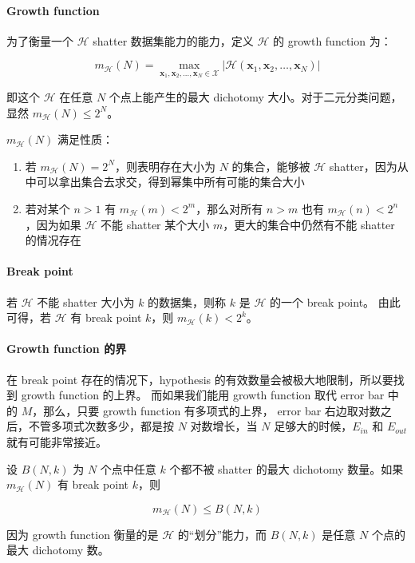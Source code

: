 \documentclass[a4paper]{article}
\begin{document}
\paragraph{Growth function}
为了衡量一个 $\mathcal{H}$ shatter 数据集能力的能力，定义 $\mathcal{H}$ 的 growth function 为：

$$m_{\mathcal{H}}(N) = \max_{\mathbf{x}_1, \mathbf{x}_2, \dots, \mathbf{x}_N \in \mathcal{X}}|\mathcal{H}(\mathbf{x}_1, \mathbf{x}_2, \dots, \mathbf{x}_N)|$$

即这个 $\mathcal{H}$ 在任意 $N$ 个点上能产生的最大 dichotomy 大小。对于二元分类问题，显然 $m_{\mathcal{H}}(N) \le 2^N$。

$m_{\mathcal{H}}(N)$ 满足性质：
\begin{enumerate}
  \item 若 $m_{\mathcal{H}}(N) = 2^N$，则表明存在大小为 $N$ 的集合，能够被 $\mathcal{H}$ shatter，因为从中可以拿出集合去求交，得到幂集中所有可能的集合大小
  \item 若对某个 $n > 1$ 有 $m_{\mathcal{H}}(m) < 2^m$，那么对所有 $n > m$ 也有 $m_{\mathcal{H}}(n) < 2^n$，因为如果 $\mathcal{H}$ 不能 shatter 某个大小 $m$，更大的集合中仍然有不能 shatter 的情况存在
\end{enumerate}

\paragraph{Break point}
若 $\mathcal{H}$ 不能 shatter 大小为 $k$ 的数据集，则称 $k$ 是 $\mathcal{H}$ 的一个 break point。
由此可得，若 $\mathcal{H}$ 有 break point $k$，则 $m_{\mathcal{H}}(k) < 2^k$。

\paragraph{Growth function 的界}
在 break point 存在的情况下，hypothesis 的有效数量会被极大地限制，所以要找到 growth function 的上界。
而如果我们能用 growth function 取代 error bar 中的 $M$，那么，只要 growth function 有多项式的上界，
error bar 右边取对数之后，不管多项式次数多少，都是按 $N$ 对数增长，当 $N$ 足够大的时候，$E_{in}$ 和 $E_{out}$
就有可能非常接近。

设 $B(N, k)$ 为 $N$ 个点中任意 $k$ 个都不被 shatter 的最大 dichotomy 数量。如果 $m_{\mathcal{H}}(N)$ 有 break point $k$，则

$$m_{\mathcal{H}}(N) \le B(N, k)$$

因为 growth function 衡量的是 $\mathcal{H}$ 的“划分”能力，而 $B(N, k)$ 是任意 $N$ 个点的最大 dichotomy 数。
\end{document}
